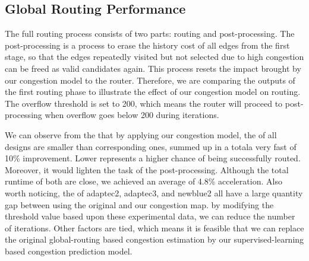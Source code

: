 \subsection{Global Routing Performance}
The full routing process consists of two parts: routing and post-processing. The post-processing is a process to erase the history cost of all edges from the first stage, so that the edges repeatedly visited but not selected due to high congestion can be freed as valid candidates again. This process resets the impact brought by our congestion model to the router. Therefore, we are comparing the outputs of the first routing phase to illustrate the effect of our congestion model on routing. The overflow threshold is set to 200, which means the router will proceed to post-processing when overflow goes below 200 during iterations.

We can observe from the  that by applying our congestion model, the  of all designs are smaller than corresponding ones, summed up in a totala very fast of 10\% improvement.
Lower  represents a higher chance of being successfully routed.
Moreover, it would lighten the task of the post-processing. Although the total runtime of both are close, we achieved an average of 4.8\% acceleration. Also worth noticing, the  of adaptec2, adaptec3, and newblue2 all have a large quantity gap between using the original and our congestion map. by modifying the threshold value based upon these experimental data, we can reduce the number of iterations. Other factors are tied, which means it is feasible that we can replace the original global-routing based congestion estimation by our supervised-learning based congestion prediction model.


